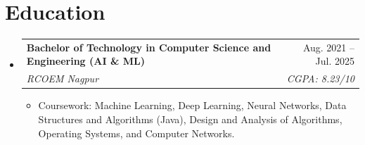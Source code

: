 \documentclass[a4paper,10pt]{article}
\makeatletter
\newcommand{\resumeItem}[1]{\item \small{#1}}
\newcommand{\resumeSubheading}[4]{\item \begin{tabularx}{\textwidth}{@{}Xr@{}}\textbf{#1} & #2 \\ \textit{\small #3} & \textit{\small #4}\end{tabularx}\vspace{-5pt}}
\makeatother
\begin{document}
\section{Education}
\begin{itemize}[leftmargin=0in,label={}]
  \resumeSubheading{Bachelor of Technology in Computer Science and Engineering (AI \& ML)}{Aug. 2021 -- Jul. 2025}{RCOEM Nagpur}{CGPA: 8.23/10}
  \begin{itemize}
    \resumeItem{Coursework: Machine Learning, Deep Learning, Neural Networks, Data Structures and Algorithms (Java), Design and Analysis of Algorithms, Operating Systems, and Computer Networks.}
  \end{itemize}
\end{itemize}
\end{document}
